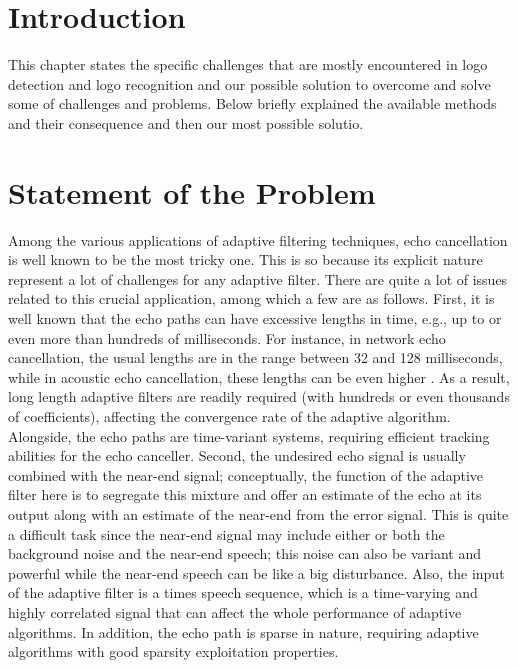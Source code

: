 \section{Introduction}\label{sec:2.1}
\vspace{-0.5cm}
\noindent This chapter states the specific challenges that are mostly encountered in logo detection and logo recognition and our possible solution to overcome and solve some of challenges and problems. Below briefly explained the available methods and their consequence and then our most possible solutio.

\vspace{-0.3cm}
\section{Statement of the Problem}\label{sec:2.2}
\vspace{-0.5cm}
\noindent Among the various applications of adaptive filtering techniques, echo cancellation is well known to be the most tricky one. This is so because its explicit nature represent a lot of challenges for any adaptive filter. There are quite a lot of issues related to this crucial application, among which a few are as follows. First, it is well known that the echo paths can have excessive lengths in time, e.g., up to or even more than hundreds of milliseconds. For instance, in network echo cancellation, the usual lengths are in the range between 32 and 128 milliseconds, while in acoustic echo cancellation, these lengths can be even higher \cite{Duttweiler}. As a result, long length adaptive filters are  readily required (with hundreds or even thousands of coefficients), affecting the convergence rate of the adaptive algorithm. Alongside, the echo paths are time-variant systems, requiring efficient tracking abilities for the echo canceller. Second, the undesired echo signal is usually combined with the near-end signal; conceptually, the function of the adaptive filter here is to
segregate this mixture and offer an estimate of the echo at its output along with an estimate of the near-end from the error signal. This is quite a difficult task since the near-end signal may include either or both the background noise and the near-end speech; this noise can also be variant and powerful while the near-end speech can be like a big disturbance. Also, the input of the adaptive filter is a times speech sequence, which is a time-varying and highly correlated signal that can affect the whole performance of adaptive algorithms. In addition, the echo path is sparse in nature, requiring adaptive algorithms with good sparsity exploitation properties.

